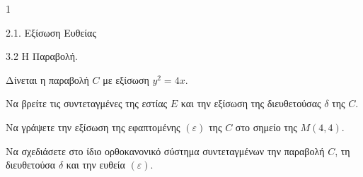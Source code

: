 \begin{ylh}{1}
    \item 2.1. Εξίσωση Ευθείας
    \item 3.2 Η Παραβολή.
\end{ylh}
Δίνεται η παραβολή $C$ με εξίσωση $y^2 = 4x$.
\begin{alist}
\item Να βρείτε τις συντεταγμένες της εστίας $E$ και την εξίσωση της διευθετούσας $\delta$ της $C$. 
\item Να γράψετε την εξίσωση της εφαπτομένης $(\varepsilon)$ της $C$ στο σημείο της $M(4,4)$. 
\item Να σχεδιάσετε στο ίδιο ορθοκανονικό σύστημα συντεταγμένων την παραβολή $C$, τη διευθετούσα $\delta$ και την ευθεία $(\varepsilon)$. 
\end{alist}